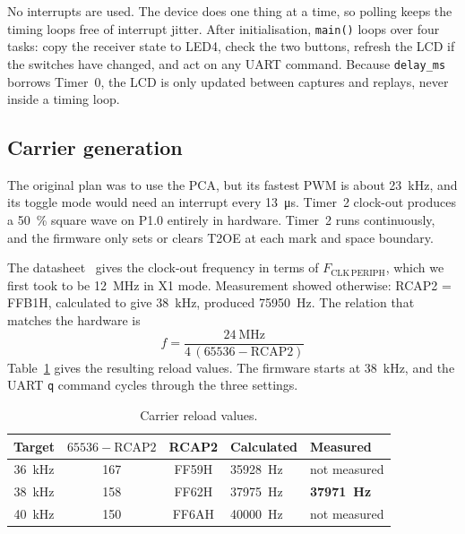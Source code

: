 \documentclass[11pt,a4paper]{article}
\newcommand{\code}[1]{\texttt{#1}}
\begin{document}
No interrupts are used. The device does one thing at a time, so polling keeps the timing loops free of interrupt jitter. After initialisation, \code{main()} loops over four tasks: copy the receiver state to LED4, check the two buttons, refresh the LCD if the switches have changed, and act on any UART command. Because \code{delay\_ms} borrows Timer~0, the LCD is only updated between captures and replays, never inside a timing loop.

\subsection{Carrier generation}

The original plan was to use the PCA, but its fastest PWM is about \qty{23}{\kilo\hertz}, and its toggle mode would need an interrupt every \qty{13}{\micro\second}. Timer~2 clock-out produces a \qty{50}{\percent} square wave on P1.0 entirely in hardware. Timer~2 runs continuously, and the firmware only sets or clears T2OE at each mark and space boundary.



The datasheet~\cite{at89c5131} gives the clock-out frequency in terms of $F_{\mathrm{CLK\,PERIPH}}$, which we first took to be \qty{12}{\mega\hertz} in X1 mode. Measurement showed otherwise: RCAP2 = FFB1H, calculated to give \qty{38}{\kilo\hertz}, produced \qty{75950}{\hertz}. The relation that matches the hardware is
\[
f = \frac{\qty{24}{\mega\hertz}}{4\,(65536 - \mathrm{RCAP2})}
\]
Table~\ref{tab:carrier} gives the resulting reload values. The firmware starts at \qty{38}{\kilo\hertz}, and the UART \code{q} command cycles through the three settings.

\begin{table}[H]
\centering
\caption{Carrier reload values.}
\label{tab:carrier}
\begin{tabular}{cccll}
\toprule
Target & $65536 - \mathrm{RCAP2}$ & RCAP2 & Calculated & Measured\\
\midrule
\qty{36}{\kilo\hertz} & 167 & FF59H & \qty{35928}{\hertz} & not measured\\
\qty{38}{\kilo\hertz} & 158 & FF62H & \qty{37975}{\hertz} & \textbf{\qty{37971}{\hertz}}\\
\qty{40}{\kilo\hertz} & 150 & FF6AH & \qty{40000}{\hertz} & not measured\\
\bottomrule
\end{tabular}
\end{table}
\end{document}
